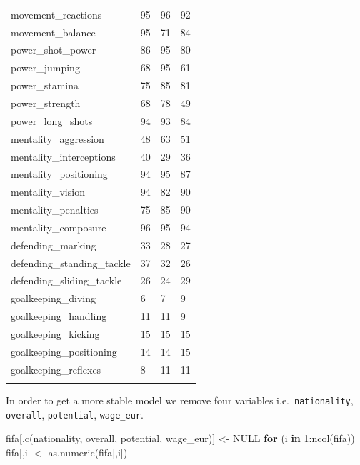 \documentclass[
]{scrbook}
\newenvironment{Shaded}{\begin{snugshade}}{\end{snugshade}}
\newcommand{\ConstantTok}[1]{\textcolor[rgb]{0.00,0.00,0.00}{#1}}
\newcommand{\ControlFlowTok}[1]{\textcolor[rgb]{0.13,0.29,0.53}{\textbf{#1}}}
\newcommand{\DecValTok}[1]{\textcolor[rgb]{0.00,0.00,0.81}{#1}}
\newcommand{\FunctionTok}[1]{\textcolor[rgb]{0.00,0.00,0.00}{#1}}
\newcommand{\NormalTok}[1]{#1}
\newcommand{\OtherTok}[1]{\textcolor[rgb]{0.56,0.35,0.01}{#1}}
\newcommand{\SpecialCharTok}[1]{\textcolor[rgb]{0.00,0.00,0.00}{#1}}
\newcommand{\StringTok}[1]{\textcolor[rgb]{0.31,0.60,0.02}{#1}}
\renewenvironment{Shaded} {\begin{snugshade}\small} {\end{snugshade}}
\begin{document}
\begin{longtable}[]{@{}llll@{}}
movement\_reactions & 95 & 96 & 92 \\ \addlinespace
movement\_balance & 95 & 71 & 84 \\ \addlinespace
power\_shot\_power & 86 & 95 & 80 \\ \addlinespace
power\_jumping & 68 & 95 & 61 \\ \addlinespace
power\_stamina & 75 & 85 & 81 \\ \addlinespace
power\_strength & 68 & 78 & 49 \\ \addlinespace
power\_long\_shots & 94 & 93 & 84 \\ \addlinespace
mentality\_aggression & 48 & 63 & 51 \\ \addlinespace
mentality\_interceptions & 40 & 29 & 36 \\ \addlinespace
mentality\_positioning & 94 & 95 & 87 \\ \addlinespace
mentality\_vision & 94 & 82 & 90 \\ \addlinespace
mentality\_penalties & 75 & 85 & 90 \\ \addlinespace
mentality\_composure & 96 & 95 & 94 \\ \addlinespace
defending\_marking & 33 & 28 & 27 \\ \addlinespace
defending\_standing\_tackle & 37 & 32 & 26 \\ \addlinespace
defending\_sliding\_tackle & 26 & 24 & 29 \\ \addlinespace
goalkeeping\_diving & 6 & 7 & 9 \\ \addlinespace
goalkeeping\_handling & 11 & 11 & 9 \\ \addlinespace
goalkeeping\_kicking & 15 & 15 & 15 \\ \addlinespace
goalkeeping\_positioning & 14 & 14 & 15 \\ \addlinespace
goalkeeping\_reflexes & 8 & 11 & 11 \\ \addlinespace
\bottomrule
\end{longtable}

In order to get a more stable model we remove four variables i.e.~\texttt{nationality}, \texttt{overall}, \texttt{potential}, \texttt{wage\_eur}.

\begin{Shaded}
\begin{Highlighting}[]
\NormalTok{fifa[,}\FunctionTok{c}\NormalTok{(}\StringTok{\textquotesingle{}nationality\textquotesingle{}}\NormalTok{, }\StringTok{\textquotesingle{}overall\textquotesingle{}}\NormalTok{, }\StringTok{\textquotesingle{}potential\textquotesingle{}}\NormalTok{, }\StringTok{\textquotesingle{}wage\_eur\textquotesingle{}}\NormalTok{)] }\OtherTok{\textless{}{-}} \ConstantTok{NULL}
\ControlFlowTok{for}\NormalTok{ (i }\ControlFlowTok{in} \DecValTok{1}\SpecialCharTok{:}\FunctionTok{ncol}\NormalTok{(fifa))           fifa[,i] }\OtherTok{\textless{}{-}} \FunctionTok{as.numeric}\NormalTok{(fifa[,i])}
\end{Highlighting}
\end{Shaded}
\end{document}
